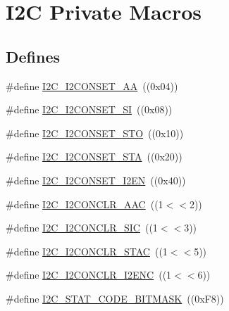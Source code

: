 \hypertarget{group___i2_c___private___macros}{\section{\-I2\-C \-Private \-Macros}
\label{group___i2_c___private___macros}
}
\subsection*{\-Defines}
\begin{DoxyCompactItemize}
\item 
\#define \hyperlink{group___i2_c___private___macros_ga784c4b2fe7f3299e338655d2ddbf283c}{\-I2\-C\-\_\-\-I2\-C\-O\-N\-S\-E\-T\-\_\-\-A\-A}~((0x04))
\item 
\#define \hyperlink{group___i2_c___private___macros_gaa447cd2686805ef8009fc599144ee3dc}{\-I2\-C\-\_\-\-I2\-C\-O\-N\-S\-E\-T\-\_\-\-S\-I}~((0x08))
\item 
\#define \hyperlink{group___i2_c___private___macros_gaae292803a059b84eac20ab8777d113af}{\-I2\-C\-\_\-\-I2\-C\-O\-N\-S\-E\-T\-\_\-\-S\-T\-O}~((0x10))
\item 
\#define \hyperlink{group___i2_c___private___macros_gabaad3370eb35644c135d40f06adbbba0}{\-I2\-C\-\_\-\-I2\-C\-O\-N\-S\-E\-T\-\_\-\-S\-T\-A}~((0x20))
\item 
\#define \hyperlink{group___i2_c___private___macros_gab836acc31e0572bb0d0db614f0641f15}{\-I2\-C\-\_\-\-I2\-C\-O\-N\-S\-E\-T\-\_\-\-I2\-E\-N}~((0x40))
\item 
\#define \hyperlink{group___i2_c___private___macros_gaa13b19babb8442aa9047f8ecb92a908d}{\-I2\-C\-\_\-\-I2\-C\-O\-N\-C\-L\-R\-\_\-\-A\-A\-C}~((1$<$$<$2))
\item 
\#define \hyperlink{group___i2_c___private___macros_ga36753112210a8c33d566b572b63b753b}{\-I2\-C\-\_\-\-I2\-C\-O\-N\-C\-L\-R\-\_\-\-S\-I\-C}~((1$<$$<$3))
\item 
\#define \hyperlink{group___i2_c___private___macros_gab6148bf41d7fc32bd259d2f6a7d7667d}{\-I2\-C\-\_\-\-I2\-C\-O\-N\-C\-L\-R\-\_\-\-S\-T\-A\-C}~((1$<$$<$5))
\item 
\#define \hyperlink{group___i2_c___private___macros_ga92718ac11d46f6e32d526749f09d01b2}{\-I2\-C\-\_\-\-I2\-C\-O\-N\-C\-L\-R\-\_\-\-I2\-E\-N\-C}~((1$<$$<$6))
\item 
\#define \hyperlink{group___i2_c___private___macros_gafeb8b5f682a81a2cc32f6c4b720a5e1f}{\-I2\-C\-\_\-\-S\-T\-A\-T\-\_\-\-C\-O\-D\-E\-\_\-\-B\-I\-T\-M\-A\-S\-K}~((0x\-F8))
\item 

\end{DoxyCompactItemize}
